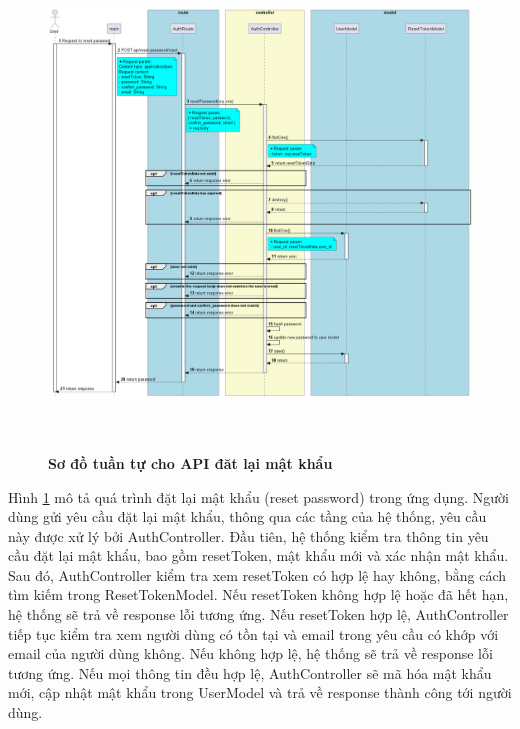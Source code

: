 \begin{enumerate}[a)]
\begin{figure}[H]
  \centering
  \includegraphics[width=16cm,height=13cm]{Images/server/sequence/server/resetPassword.png}
  \caption[Sơ đồ tuần tự cho API đăt lại mật khẩu ]{\bfseries \fontsize{12pt}{0pt}
  \selectfont Sơ đồ tuần tự cho API đăt lại mật khẩu }
  \label{resetPassword} %
\end{figure}
Hình \ref{resetPassword} mô tả quá trình đặt lại mật khẩu (reset password) trong ứng dụng. Người dùng gửi yêu cầu đặt lại mật khẩu, thông qua các tầng của hệ thống, yêu cầu này được xử lý bởi AuthController. Đầu tiên, hệ thống kiểm tra thông tin yêu cầu đặt lại mật khẩu, bao gồm resetToken, mật khẩu mới và xác nhận mật khẩu. Sau đó, AuthController kiểm tra xem resetToken có hợp lệ hay không, bằng cách tìm kiếm trong ResetTokenModel. Nếu resetToken không hợp lệ hoặc đã hết hạn, hệ thống sẽ trả về response lỗi tương ứng. Nếu resetToken hợp lệ, AuthController tiếp tục kiểm tra xem người dùng có tồn tại và email trong yêu cầu có khớp với email của người dùng không. Nếu không hợp lệ, hệ thống sẽ trả về response lỗi tương ứng. Nếu mọi thông tin đều hợp lệ, AuthController sẽ mã hóa mật khẩu mới, cập nhật mật khẩu trong UserModel và trả về response thành công tới người dùng.


\end{enumerate}
